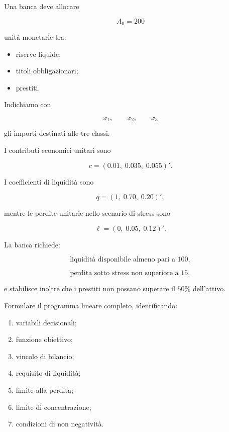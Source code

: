 \begin{exercise}

\label{ex:cap11-proposto-formulazione}

Una banca deve allocare

\[
A_0=200
\]

\noindent unit\`a monetarie tra:

\begin{itemize}

\item riserve liquide;

\item titoli obbligazionari;

\item prestiti.

\end{itemize}

Indichiamo con

\[
x_1,\qquad x_2,\qquad x_3
\]

\noindent gli importi destinati alle tre classi.

I contributi economici unitari sono

\[
c=(0.01,\;0.035,\;0.055)'.
\]

I coefficienti di liquidit\`a sono

\[
q=(1,\;0.70,\;0.20)',
\]

\noindent mentre le perdite unitarie nello scenario di stress sono

\[
\ell=(0,\;0.05,\;0.12)'.
\]

La banca richiede:

\[
\text{liquidit\`a disponibile almeno pari a }100,
\]

\[
\text{perdita sotto stress non superiore a }15,
\]

\noindent e stabilisce inoltre che i prestiti non possano superare il \(50\%\)
dell'attivo.

Formulare il programma lineare completo, identificando:

\begin{enumerate}

\item variabili decisionali;

\item funzione obiettivo;

\item vincolo di bilancio;

\item requisito di liquidit\`a;

\item limite alla perdita;

\item limite di concentrazione;

\item condizioni di non negativit\`a.

\end{enumerate}

\end{exercise}

